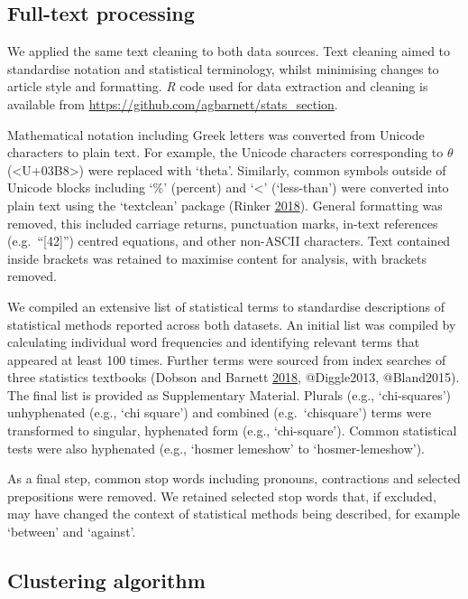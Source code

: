 \documentclass[
]{article}
\begin{document}
\hypertarget{full-text-processing}{%
\subsection{Full-text processing}\label{full-text-processing}}

We applied the same text cleaning to both data sources.
Text cleaning aimed to standardise notation and statistical terminology, whilst minimising changes to article style and formatting. \emph{R} code used for data extraction and cleaning is available from \url{https://github.com/agbarnett/stats_section}.

Mathematical notation including Greek letters was converted from Unicode characters to plain text. For example, the Unicode characters corresponding to \(\theta\) (\textless U+03B8\textgreater) were replaced with `theta'. Similarly, common symbols outside of Unicode blocks including `\%' (percent) and `\textless{}' (`less-than') were converted into plain text using the `textclean' package (Rinker \protect\hyperlink{ref-textclean}{2018}). General formatting was removed, this included carriage returns, punctuation marks, in-text references (e.g.~``{[}42{]}'') centred equations, and other non-ASCII characters. Text contained inside brackets was retained to maximise content for analysis, with brackets removed.

We compiled an extensive list of statistical terms to standardise descriptions of statistical methods reported across both datasets. An initial list was compiled by calculating individual word frequencies and identifying relevant terms that appeared at least 100 times. Further terms were sourced from index searches of three statistics textbooks (Dobson and Barnett \protect\hyperlink{ref-Dobson2018}{2018}, @Diggle2013, @Bland2015). The final list is provided as Supplementary Material. Plurals (e.g., `chi-squares') unhyphenated (e.g., `chi square') and combined (e.g.~`chisquare') terms were transformed to singular, hyphenated form (e.g., `chi-square'). Common statistical tests were also hyphenated (e.g., `hosmer lemeshow' to `hosmer-lemeshow').

As a final step, common stop words including pronouns, contractions and selected prepositions were removed. We retained selected stop words that, if excluded, may have changed the context of statistical methods being described, for example `between' and `against'.

\hypertarget{clustering-algorithm}{%
\subsection{Clustering algorithm}\label{clustering-algorithm}}
\end{document}
